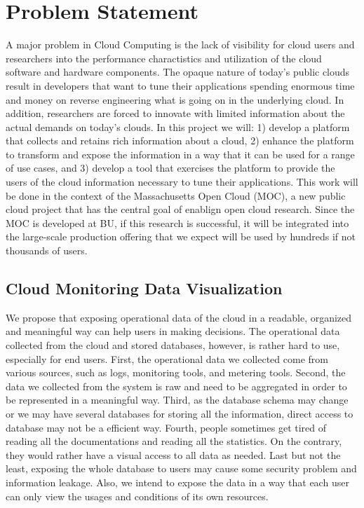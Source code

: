 \section{Problem Statement}
\label{sec:ProblemStatement}

A major problem in Cloud Computing is the lack of visibility for cloud users and researchers into the performance charactistics and utilization of the cloud software and hardware components. The opaque nature of today’s public clouds result in developers that want to tune their applications spending enormous time and money on reverse engineering what is going on in the underlying cloud. In addition, researchers are forced to innovate with limited information about the actual demands on today’s clouds. In this project we will: 1) develop a platform that collects and retains rich information about a cloud, 2) enhance the platform to transform and expose the information in a way that it can be used for a range of use cases, and 3) develop a tool that exercises the platform to provide the users of the cloud information necessary to tune their applications. This work will be done in the context of the Massachusetts Open Cloud (MOC), a new public cloud project that has the central goal of enablign open cloud research. Since the MOC is developed at BU, if this research is successful, it will be integrated into the large-scale production offering that we expect will be used by hundreds if not thousands of users.  



\subsection{Cloud Monitoring Data Visualization}
  We propose that exposing operational data of the cloud in a readable, organized and meaningful way can help users in making decisions. The operational data collected from the cloud and stored databases, however, is rather hard to use, especially for end users. First, the operational data we collected come from various sources, such as logs, monitoring tools, and metering tools. Second, the data we collected from the system is raw and need to be aggregated in order to be represented in a meaningful way. Third, as the database schema may change or we may have several databases for storing all the information, direct access to database may not be a efficient way. Fourth, people sometimes get tired of reading all the documentations and reading all the statistics. On the contrary, they would rather have a visual access to all data as needed. Last but not the least, exposing the whole database to users may cause some security problem and information leakage. Also, we intend to expose the data in a way that each user can only view the usages and conditions of its own resources.  

